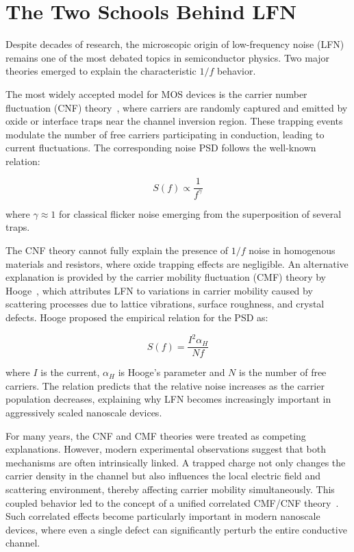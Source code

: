 \documentclass[10pt,a4paper]{article}
\begin{document}
	\section{The Two Schools Behind LFN}
	
	Despite decades of research, the microscopic origin of low-frequency noise (LFN) remains one of the most debated topics in semiconductor physics. Two major theories emerged to explain the characteristic $1/f$ behavior.
	
	The most widely accepted model for MOS devices is the carrier number fluctuation (CNF) theory~\cite{McWhorter1957}, where carriers are randomly captured and emitted by oxide or interface traps near the channel inversion region. These trapping events modulate the number of free carriers participating in conduction, leading to current fluctuations. The corresponding noise PSD follows the well-known relation:
	
	\begin{equation}
		S(f) \propto \frac{1}{f^{\gamma}}
		\label{eq:cnf}
	\end{equation}
	
	where $\gamma \approx 1$ for classical flicker noise emerging from the superposition of several traps.
	
	The CNF theory cannot fully explain the presence of $1/f$ noise in homogenous materials and resistors, where oxide trapping effects are negligible. An alternative explanation is provided by the carrier mobility fluctuation (CMF) theory by Hooge~\cite{Hooge1994}, which attributes LFN to variations in carrier mobility caused by scattering processes due to lattice vibrations, surface roughness, and crystal defects. Hooge proposed the empirical relation for the PSD as:
	
	\begin{equation}
		S(f) = \frac{I^{2}\alpha_{H}}{Nf}
		\label{eq:hooge}
	\end{equation}
	
	where $I$ is the current, $\alpha_{H}$ is Hooge's parameter and $N$ is the number of free carriers. The relation predicts that the relative noise increases as the carrier population decreases, explaining why LFN becomes increasingly important in aggressively scaled nanoscale devices.
	
	For many years, the CNF and CMF theories were treated as competing explanations. However, modern experimental observations suggest that both mechanisms are often intrinsically linked. A trapped charge not only changes the carrier density in the channel but also influences the local electric field and scattering environment, thereby affecting carrier mobility simultaneously. This coupled behavior led to the concept of a unified correlated CMF/CNF theory~\cite{Hung1990}. Such correlated effects become particularly important in modern nanoscale devices, where even a single defect can significantly perturb the entire conductive channel.
	
\end{document}
